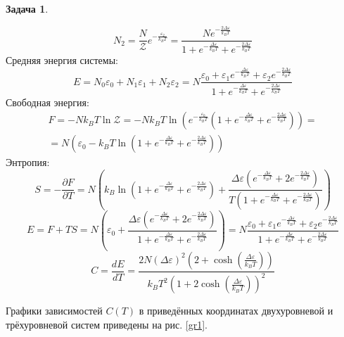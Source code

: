 \documentclass[12pt]{article}
\theoremstyle{definition}
\newtheorem{zad}{Задача}[section]
\begin{document}
\begin{zad}
\begin{enumerate}
\begin{equation}
    \end{equation}
    \begin{equation}
        N_2=\frac{N}{\mathcal{Z}}e^{-\frac{\varepsilon_2}{k_BT}}=\frac{Ne^{-\frac{2\Delta\varepsilon}{k_BT}}}{1+e^{-\frac{\Delta\varepsilon}{k_BT}}+e^{-\frac{2\Delta\varepsilon}{k_BT}}}
    \end{equation}
    Средняя энергия системы:
    \begin{equation}
        E=N_0\varepsilon_0+N_1\varepsilon_1+N_2\varepsilon_2=N\frac{\varepsilon_0+\varepsilon_1e^{-\frac{\Delta\varepsilon}{k_BT}}+\varepsilon_2e^{-\frac{2\Delta\varepsilon}{k_BT}}}{1+e^{-\frac{\Delta\varepsilon}{k_BT}}+e^{-\frac{2\Delta\varepsilon}{k_BT}}}
    \end{equation}
    Свободная энергия:
    \begin{multline}
        F=-Nk_BT\ln\mathcal{Z}=-Nk_BT\ln\left(e^{-\frac{\varepsilon_0}{k_BT}}\left(1+e^{-\frac{\Delta\varepsilon}{k_BT}}+e^{-\frac{2\Delta\varepsilon}{k_BT}}\right)\right)=\\=N\left(\varepsilon_0-k_BT\ln\left(1+e^{-\frac{\Delta\varepsilon}{k_BT}}+e^{-\frac{2\Delta\varepsilon}{k_BT}}\right)\right)
    \end{multline}
    Энтропия:
    \begin{equation}
        S=-\frac{\partial F}{\partial     T}=N\left(k_B\ln\left(1+e^{-\frac{\Delta\varepsilon}{k_BT}}+e^{-\frac{2\Delta\varepsilon}{k_BT}}\right)+\frac{\Delta\varepsilon(e^{-\frac{\Delta\varepsilon}{k_BT}}+2e^{-\frac{2\Delta\varepsilon}{k_BT}})}{T\left(1+e^{-\frac{\Delta\varepsilon}{k_BT}}+e^{-\frac{2\Delta\varepsilon}{k_BT}}\right)}\right)
    \end{equation}
    \begin{equation}
        E=F+TS=N\left(\varepsilon_0+\frac{\Delta\varepsilon(e^{-\frac{\Delta\varepsilon}{k_BT}}+2e^{-\frac{2\Delta\varepsilon}{k_BT}})}{1+e^{-\frac{\Delta\varepsilon}{k_BT}}+e^{-\frac{2\Delta\varepsilon}{k_BT}}}\right)=N\frac{\varepsilon_0+\varepsilon_1e^{-\frac{\Delta\varepsilon}{k_BT}}+\varepsilon_2e^{-\frac{2\Delta\varepsilon}{k_BT}}}{1+e^{-\frac{\Delta\varepsilon}{k_BT}}+e^{-\frac{2\Delta\varepsilon}{k_BT}}}
    \end{equation}
    \begin{equation}
        \boxed{C=\frac{dE}{dT}=\frac{2N(\Delta\varepsilon)^2\left(2+\cosh\left(\frac{\Delta\varepsilon}{k_BT}\right)\right)}{k_BT^2\left(1+2\cosh\left(\frac{\Delta\varepsilon}{k_BT}\right)\right)^2}}
    \end{equation}
\end{enumerate}
Графики зависимостей $C(T)$ в приведённых координатах двухуровневой и трёхуровневой систем приведены на рис. \ref{gr1}.
\end{zad}
\end{document}
